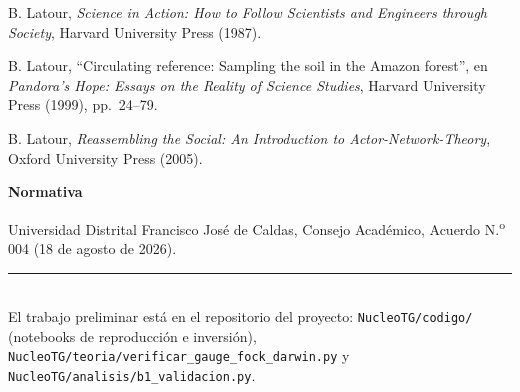 \documentclass[12pt,letterpaper]{article}
\begin{document}
\begin{enumerate}[leftmargin=2em,label={[\arabic*]}]
  \item B. Latour, \emph{Science in Action: How to Follow Scientists and Engineers through Society}, Harvard University
        Press (1987).
  \item B. Latour, ``Circulating reference: Sampling the soil in the Amazon forest'', en \emph{Pandora's Hope: Essays on the
        Reality of Science Studies}, Harvard University Press (1999), pp.~24--79.
  \item B. Latour, \emph{Reassembling the Social: An Introduction to Actor-Network-Theory}, Oxford University Press (2005).
\item[] \textbf{Normativa}
  \item Universidad Distrital Francisco José de Caldas, Consejo Académico, Acuerdo N.\textsuperscript{o} 004 (18 de agosto de 2026).
\end{enumerate}

\vfill
\noindent\rule{\linewidth}{0.4pt}\\
\footnotesize El trabajo preliminar está en el repositorio del proyecto: \texttt{NucleoTG/codigo/} (notebooks de
reproducción e inversión), \texttt{NucleoTG/teoria/verificar\_gauge\_fock\_darwin.py} y
\texttt{NucleoTG/analisis/b1\_validacion.py}.
\end{document}

